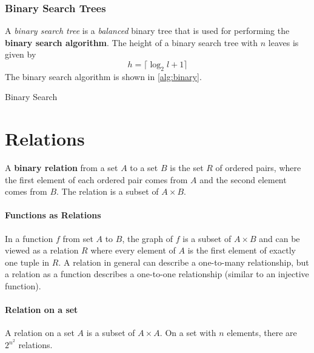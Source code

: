 \subsubsection{Binary Search Trees}
A \emph{binary search tree} is a \emph{balanced} binary tree that is used for performing the \textbf{binary search algorithm}. The height of a binary search tree with \( n \) leaves is given by \[
h = \lceil \log_2{l+1} \rceil	
\]
The binary search algorithm is shown in \autoref{alg:binary}.

\begin{algorithm}[H]
	\caption{Binary Search}\label{alg:binary}
	\begin{algorithmic}

		\Else{}
		\EndIf{}
		\EndWhile{}

		\EndFunction{}
	\end{algorithmic}
\end{algorithm}
 
\section{Relations}
A \textbf{binary relation} from a set \( A \) to a set \( B \) is the set \( R \) of ordered pairs, where the first element of each ordered pair comes from \( A \) and the second element comes from \( B \). The relation is a subset of \( A \times B \).

\paragraph{Functions as Relations} In a function \( f \) from set \( A \) to \( B \), the graph of \( f \) is a subset of \( A \times B \) and can be viewed as a relation \( R \) where every element of \( A \) is the first element of exactly one tuple in \( R \). A relation in general can describe a one-to-many relationship, but a relation as a function describes a one-to-one relationship (similar to an injective function).

\paragraph{Relation on a set} A relation on a set \( A \) is a subset of \( A \times A \). On a set with \( n \) elements, there are \( 2^{n^2} \) relations.

